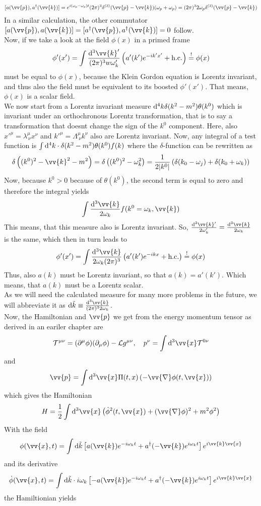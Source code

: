 \documentclass{include/thesisclass}
\newcommand{\LL}{\mathcal{L}}
\newcommand{\cc}{\cdot}
\newcommand{\vx}{\vv{x}}
\newcommand{\vp}{\vv{p}}
\newcommand{\dd}{{\rm d}}
\newcommand{\p}{\partial}
\newcommand{\soll}{\overset{!}{=}}
\newcommand{\vn}{\vv{\nabla}}
\newcommand{\hc}{\text{h.c.}}
\begin{document}
\[ [a(\vp) , a^\dagger( \vv{k})] = e^{i(\omega_p - \omega_p)t} (2\pi)^3 \delta^{(3)}(\vp - \vv{k}) ( \omega_p + \omega_p) = (2\pi)^3 2 \omega _p \delta^{(3)}(\vp - \vv{k})\]
In a similar calculation, the other commutator $[a(\vp), a(\vv{k})] = [a^\dagger(\vp), a^\dagger(\vv{k})] = 0$ follow.\\
Now, if we take a look at the field $\phi(x)$ in a primed frame
\[ \phi'(x') = \int \frac{\dd^3 \vv{k}'}{(2\pi)^3 w \omega_k'} \left( a'(k') e^{-i k'x'} + \hc\right) \soll \phi(x)\]
must be equal to $\phi(x)$, because the Klein Gordon equation is Lorentz invariant, and thus also the field must be equivalent to its boosted $\phi'(x')$. That means, $\phi(x)$ is a scalar field.\\
We now start from a Lorentz invariant measure $\dd ^4 k \delta( k^2 - m^2) \theta(k^0)$ which is invariant under an orthochronous Lorentz transformation, that is to say a transformation that doesnt change the sign of the $k^0$ component. Here, also $x'^\mu = \lambda^\mu_{~\nu} x^\nu$ and $k'^\mu = \Lambda^\mu_{~\nu}k^\nu$ also are Lorentz invariant. Now, any integral of a test function is $\int \dd^4 k\cc \delta(k^2 - m^2) \theta(k^0) f(k)$ where the $\delta$-function can be rewritten as
\[ \delta\left( (k^0)^2 - \vv{k}^2 - m^2\right) = \delta\left( (k^0)^2 - \omega_k^2\right) = \frac{1}{2 |k^0|} \left( \delta( k_0 - \omega_j) + \delta( k_0 + \omega_k)\right) \]
Now, because $k^0 > 0$ because of $\theta(k^0)$, the second term is equal to zero and therefore the integral yields
\[ \int \frac{\dd^3 \vv{k}}{2 \omega_k} f( k^0 = \omega_k, \vv{k})\]
This means, that this measure also is Lorentz invariant. So, $\frac{\dd^3 \vv{k}'}{2\omega_k'} = \frac{\dd^3 \vv{k}}{2 \omega_k}$ is the same, which then in turn leads to
\[ \phi'(x') = \int \frac{ \dd^3 \vv{k}}{2 \omega_k (2\pi)^3} \left( a'(k') e^{-i k x} + \hc\right) \soll \phi(x)\]
Thus, also $a(k)$ must be Lorentz invariant, so that $a(k) = a'(k')$. Which means, that $a(k)$ must be a Lorentz scalar.\\
As we will need the calculated measure for many more problems in the future, we will abbreviate it as $\dd \tilde{k} \equiv \frac{\dd^3 \vv{k}}{(2\pi)^3 2 \omega_k}$.\\
Now, the Hamiltonian and $\vp$ we get from the energy momentum tensor as derived in an eariler chapter are
\[ \mathcal{T}^{\mu\nu} = ( \p^\mu \phi)(\p_\mu \phi) - \LL g^{\mu\nu}, ~~~p^\nu = \int \dd^3 \vx \mathcal{T}^{0\nu}\]
and
\[ \vp = \int \dd^3 \vx \Pi(t,x)\left(-\vn \phi(t,\vx)\right)\]
which gives the Hamiltonian
\[ H = \frac{1}{2} \int \dd^3 \vx \left( \dot{\phi}^2(t,\vx) + ( \vn \phi)^2 + m^2 \phi^2\right)\]
With the field
\[ \phi(\vx, t) = \int \dd \tilde{k} \left[ a (\vv{k}) e^{-i \omega_k t} + a^\dagger(-\vv{k}) e^{i \omega_k t} \right] e^{i \vv{k}\vx}\]
and its derivative
\[ \dot{\phi}(\vx, t) = \int \dd \tilde{k}\cc i \omega_k \left[ -a(\vv{k}) e^{-i \omega_k t} + a^\dagger (-\vv{k}) e^{i \omega_k t} \right] e^{i \vv{k}\vx}\]
the Hamiltionian yields
\end{document}
